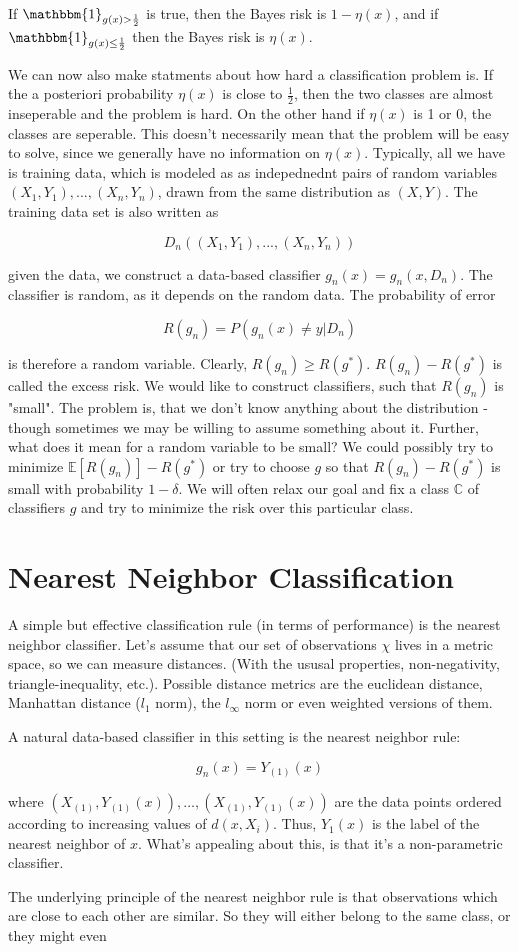 \documentclass[12pt, authoryear]{elsarticle}
\begin{document}
If $\mathbbm{1}_{g(x)>\frac{1}{2}} $ is true, then the Bayes risk is $1-\eta(x)$, and if $\mathbbm{1}_{g(x)\leq \frac{1}{2}}$ then the Bayes risk is $\eta(x)$.

We can now also make statments about how hard a classification problem is. If the a posteriori probability $\eta(x)$ is close to $\frac{1}{2}$, then the two classes are almost inseperable and the problem is hard. On the other hand if $\eta(x)$ is 1 or 0, the classes are seperable. This doesn't necessarily mean that the problem will be easy to solve, since we generally have no information on $\eta(x)$. Typically, all we have is training data, which is modeled as as indepednednt pairs of random variables $(X_1,Y_1), ... , (X_n,Y_n)$, drawn from the same distribution as $(X,Y)$. The training data set is also written as 

$$D_n( (X_1,Y_1), ... , (X_n,Y_n))$$

given the data, we construct a data-based classifier $g_n(x) = g_n(x,D_n)$. The classifier is random, as it depends on the random data. The probability of error 

$$R(g_n) = P \left(g_n(x) \neq y | D_n \right)$$

is therefore a random variable. Clearly, $R(g_n) \geq R(g^*)$. $R(g_n) - R(g^*)$ is called the excess risk. We would like to construct classifiers, such that $R(g_n)$ is "small". The problem is, that we don't know anything about the distribution - though sometimes we may be willing to assume something about it. Further, what does it mean for a random variable to be small? We could possibly try to minimize $\mathbb{E} \left[ R(g_n)  \right] - R(g^*)$ or try to choose $g$ so that $R(g_n) - R(g^*)$ is small with probability $1-\delta$. We will often relax our goal and fix a class $\mathbb{C}$ of classifiers $g$ and try to minimize the risk over this particular class. 

\section{Nearest Neighbor Classification}

A simple but effective classification rule (in terms of performance) is the nearest neighbor classifier. Let's assume that our set of observations $\chi$ lives in a metric space, so we can measure distances. (With the ususal properties, non-negativity, triangle-inequality, etc.). Possible distance metrics are the euclidean distance, Manhattan distance ($l_1$ norm), the $l_\infty$ norm or even weighted versions of them.

A natural data-based classifier in this setting is the nearest neighbor rule:

$$g_n(x) = Y_{(1)}(x)$$

where $(X_{(1)},Y_{(1)}(x)), \dots , (X_{(1)},Y_{(1)}(x))$ are the data points ordered according to increasing values of $d(x,X_i)$. Thus, $Y_1(x)$ is the label of the nearest neighbor of $x$. What's appealing about this, is that it's a non-parametric classifier.

The underlying principle of the nearest neighbor rule is that observations which are close to each other are similar. So they will either belong to the same class, or they might even 
\end{document}
